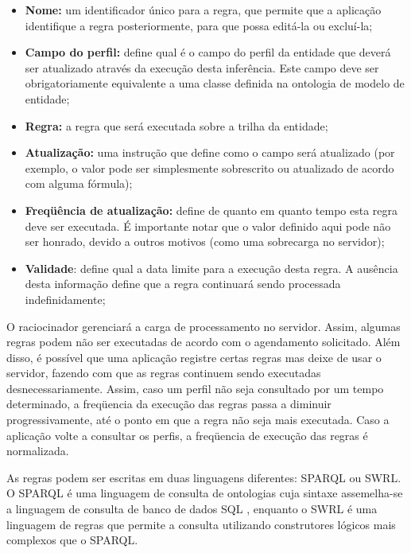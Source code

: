 \begin{itemize}

\item {\bf Nome:} um identificador único para a regra, que permite que a aplicação identifique a regra posteriormente, para que possa editá-la ou excluí-la;

\item {\bf Campo do perfil:} define qual é o campo do perfil da entidade que deverá ser atualizado através da execução desta inferência. Este campo deve ser obrigatoriamente equivalente a uma classe definida na ontologia de modelo de entidade;

\item {\bf Regra:} a regra que será executada sobre a trilha da entidade;

\item {\bf Atualização:} uma instrução que define como o campo será atualizado (por exemplo, o valor pode ser simplesmente sobrescrito ou atualizado de acordo com alguma fórmula);

\item {\bf Freqüência de atualização:} define de quanto em quanto tempo esta regra deve ser executada. É importante notar que o valor definido aqui pode não ser honrado, devido a outros motivos (como uma sobrecarga no servidor);

\item {\bf Validade}: define qual a data limite para a execução desta regra. A ausência desta informação define que a regra continuará sendo processada indefinidamente;

\end{itemize}

O raciocinador gerenciará a carga de processamento no servidor. Assim, algumas regras podem não ser executadas de acordo com o agendamento solicitado. Além disso, é possível que uma aplicação registre certas regras mas deixe de usar o servidor, fazendo com que as regras continuem sendo executadas desnecessariamente. Assim, caso um perfil não seja consultado por um tempo determinado, a freqüencia da execução das regras passa a diminuir progressivamente, até o ponto em que a regra não seja mais executada. Caso a aplicação volte a consultar os perfis, a freqüencia de execução das regras é normalizada.

As regras podem ser escritas em duas linguagens diferentes: SPARQL ou SWRL. O SPARQL \cite{sparql} é uma linguagem de consulta de ontologias cuja sintaxe assemelha-se a linguagem de consulta de banco de dados SQL \cite{sql}, enquanto o SWRL \cite{swrl} é uma linguagem de regras que permite a consulta utilizando construtores lógicos mais complexos que o SPARQL.

